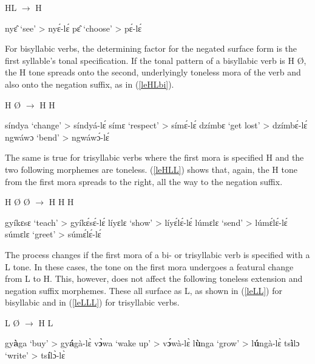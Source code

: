 \begin{exe}
\ex\label{leHL} HL $\rightarrow$ H
\begin{xlist}
\ex nyɛ̂ `see' > nyɛ́-lɛ́ 
\ex pɛ̂ `choose' > pɛ́-lɛ́
\end{xlist}
\end{exe}

For bisyllabic verbs, the determining factor for the negated surface form is the first syllable's tonal specification. If the tonal pattern of a bisyllabic verb is H {\O}, the H tone spreads onto the second, underlyingly toneless mora of the verb and also onto the negation suffix, as in (\ref{leHLbi}).

\begin{exe}
\ex\label{leHLbi} H {\O} $\rightarrow$ H H
\begin{xlist}
\ex síndya `change' > síndyá-lɛ́  
\ex símɛ  `respect' > símɛ́-lɛ́
\ex dzímbɛ `get lost'  > dzímbɛ́-lɛ́ 
\ex  ngwáwɔ `bend' > ngwáwɔ́-lɛ́
\end{xlist}
\end{exe}

\noindent The same is true for trisyllabic verbs where the first mora is specified H and the two following morphemes are toneless. (\ref{leHLL}) shows that, again, the H tone from the first mora spreads to the right, all the way to the negation suffix.

\begin{exe}
\ex\label{leHLL} H {\O} {\O} $\rightarrow$ H H H 
\begin{xlist}
\ex gyíkɛsɛ `teach' > gyíkɛ́sɛ́-lɛ́
\ex  líyɛlɛ  `show' > líyɛ́lɛ́-lɛ́
\ex lúmɛlɛ `send' >  lúmɛ́lɛ́-lɛ́
\ex  súmɛlɛ `greet' > súmɛ́lɛ́-lɛ́
\end{xlist}
\end{exe}

The process changes if the first mora of a bi- or trisyllabic verb is specified with a L tone. In these cases, the tone on the first mora undergoes a featural change from L to H. This, however, does not affect the following toneless extension and negation suffix morphemes. These all surface as L, as shown in (\ref{leLL}) for bisyllabic and in (\ref{leLLL}) for trisyllabic verbs.

\begin{exe}
\ex\label{leLL} L {\O} $\rightarrow$ H L
\begin{xlist}
\ex gy{\bfseries à}ga `buy' > gy{\bfseries á}gà-lɛ̀
\ex  v{\bfseries ɔ̀}wa  `wake up' > v{\bfseries ɔ́}wà-lɛ̀
\ex l{\bfseries ù}nga `grow'  > l{\bfseries ú}ngà-lɛ̀
\ex ts{\bfseries ì}lɔ `write' >  ts{\bfseries í}lɔ̀-lɛ̀
\end{xlist}
\end{exe}


